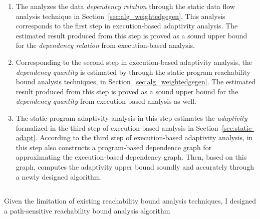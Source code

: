 \begin{enumerate}
\item The {\THESYSTEM} analyzes the data \emph{dependency relation} through the static data flow analysis technique in Section~\ref{sec:alg_weightedgegen}.
This analysis corresponds to the first step in execution-based adaptivity analysis. 
The estimated result produced from 
this step is proved as a sound upper bound for the \emph{dependency relation} from execution-based analysis.
\item 
Corresponding to the second step in execution-based adaptivity analysis, the \emph{dependency quantity} 
is estimated by {\THESYSTEM} through the static program reachability bound analysis techniques, in Section~\ref{sec:alg_weightedgegen}.
The estimated result produced from 
this step is proved as a sound upper bound for the \emph{dependency quantity} from execution-based analysis as well.
\item 
The static program adaptivity analysis in this step
estimates the \emph{adaptivity} formalized in the third step of execution-based analysis in Section~\ref{sec:static-adapt}.
According to the third step of execution-based adaptivity analysis, 
{\THESYSTEM} in this step also constructs a program-based dependence graph for approximating the execution-based dependency graph.
Then, based on this graph, {\THESYSTEM} 
computes the adaptivity upper bound soundly 
and accurately through a newly designed algorithm.
\end{enumerate}

\subsection{}
Given the limitation of existing reachability bound analysis techniques, I designed a path-sensitive reachability bound 
analysis algorithm

